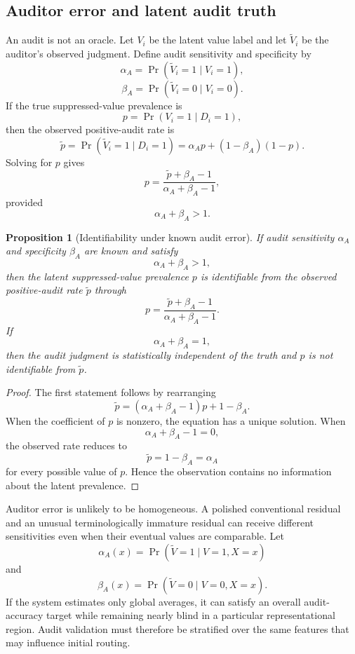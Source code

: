 \documentclass[11pt]{article}
\newtheorem{proposition}[definition]{Proposition}
\theoremstyle{definition}
\DeclareMathOperator{\Prob}{Pr}
\begin{document}
\subsection{Auditor error and latent audit truth}

An audit is not an oracle. Let \(V_i\) be the latent value label and let \(\widetilde{V}_i\) be the auditor's observed judgment. Define audit sensitivity and specificity by
\[
\alpha_A
=
\Prob(\widetilde{V}_i=1\mid V_i=1),
\]
\[
\beta_A
=
\Prob(\widetilde{V}_i=0\mid V_i=0).
\]
If the true suppressed-value prevalence is
\[
p=\Prob(V_i=1\mid D_i=1),
\]
then the observed positive-audit rate is
\[
\widetilde{p}
=
\Prob(\widetilde{V}_i=1\mid D_i=1)
=
\alpha_Ap+(1-\beta_A)(1-p).
\]
Solving for \(p\) gives
\[
p
=
\frac{
\widetilde{p}+\beta_A-1
}{
\alpha_A+\beta_A-1
},
\]
provided
\[
\alpha_A+\beta_A>1.
\]

\begin{proposition}[Identifiability under known audit error]
If audit sensitivity \(\alpha_A\) and specificity \(\beta_A\) are known and satisfy
\[
\alpha_A+\beta_A>1,
\]
then the latent suppressed-value prevalence \(p\) is identifiable from the observed positive-audit rate \(\widetilde p\) through
\[
p
=
\frac{\widetilde p+\beta_A-1}{\alpha_A+\beta_A-1}.
\]
If
\[
\alpha_A+\beta_A=1,
\]
then the audit judgment is statistically independent of the truth and \(p\) is not identifiable from \(\widetilde p\).
\end{proposition}

\begin{proof}
The first statement follows by rearranging
\[
\widetilde p
=
(\alpha_A+\beta_A-1)p+1-\beta_A.
\]
When the coefficient of \(p\) is nonzero, the equation has a unique solution. When
\[
\alpha_A+\beta_A-1=0,
\]
the observed rate reduces to
\[
\widetilde p=1-\beta_A=\alpha_A
\]
for every possible value of \(p\). Hence the observation contains no information about the latent prevalence.
\end{proof}

Auditor error is unlikely to be homogeneous. A polished conventional residual and an unusual terminologically immature residual can receive different sensitivities even when their eventual values are comparable. Let
\[
\alpha_A(x)
=
\Prob(\widetilde V=1\mid V=1,X=x)
\]
and
\[
\beta_A(x)
=
\Prob(\widetilde V=0\mid V=0,X=x).
\]
If the system estimates only global averages, it can satisfy an overall audit-accuracy target while remaining nearly blind in a particular representational region. Audit validation must therefore be stratified over the same features that may influence initial routing.
\end{document}
